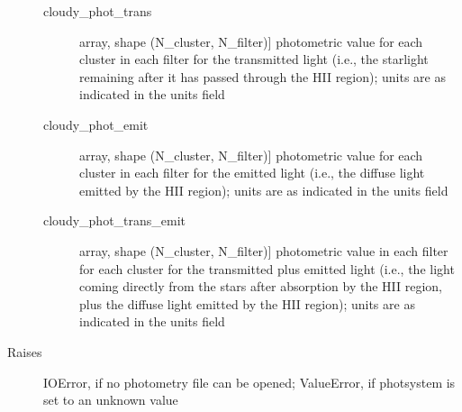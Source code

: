 \documentclass[letterpaper,10pt,english]{sphinxmanual}
\begin{document}
\begin{fulllineitems}
\begin{description}
\begin{description}
\item[{cloudy\_phot\_trans}] \leavevmode{[}array, shape (N\_cluster, N\_filter){]}
photometric value for each cluster in each filter for the
transmitted light (i.e., the starlight remaining after it has
passed through the HII region); units are as indicated in
the units field

\item[{cloudy\_phot\_emit}] \leavevmode{[}array, shape (N\_cluster, N\_filter){]}
photometric value for each cluster in each filter for the
emitted light (i.e., the diffuse light emitted by the HII
region); units are as indicated in the units field

\item[{cloudy\_phot\_trans\_emit}] \leavevmode{[}array, shape (N\_cluster, N\_filter){]}
photometric value in each filter for each cluster for the
transmitted plus emitted light (i.e., the light coming
directly from the stars after absorption by the HII region,
plus the diffuse light emitted by the HII region); units are as
indicated in the units field

\end{description}

\item[{Raises}] \leavevmode
IOError, if no photometry file can be opened;
ValueError, if photsystem is set to an unknown value

\end{description}

\end{fulllineitems}

\end{document}
